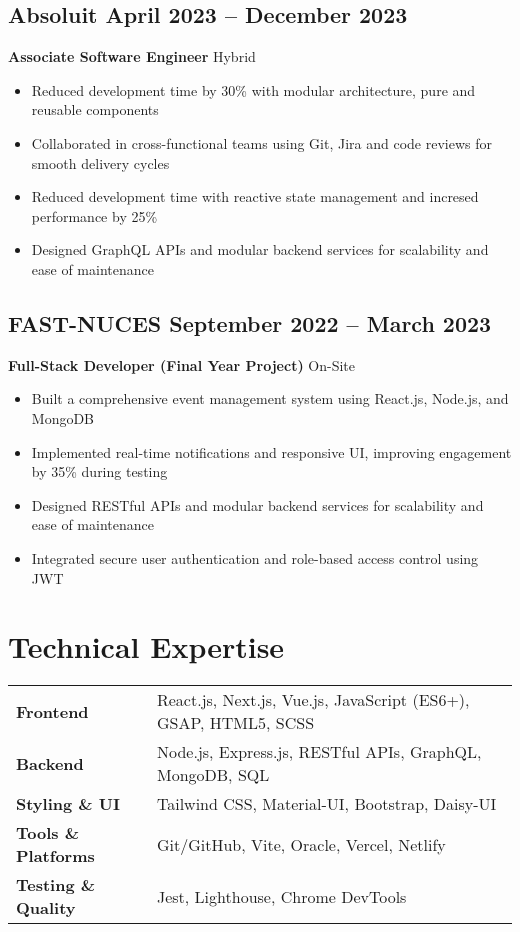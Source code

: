 \documentclass[11pt]{article}
\begin{document}
\subsection{\texorpdfstring{Absoluit \hfill April 2023 -- December 2023}{Absoluit, April 2023 -- December 2023}}
\textbf{Associate Software Engineer} \hfill Hybrid  
\begin{itemize}
\item Reduced development time by 30\% with modular architecture, pure and reusable components
\item Collaborated in cross-functional teams using Git, Jira and code reviews for smooth delivery cycles  
\item Reduced development time with reactive state management and incresed performance by 25\%
\item Designed GraphQL APIs and modular backend services for scalability and ease of maintenance  
\end{itemize}


\subsection{\texorpdfstring{FAST-NUCES \hfill September 2022 -- March 2023}{FAST-NUCES, September 2022 -- March 2023}}  
\textbf{Full-Stack Developer (Final Year Project)} \hfill On-Site  
\begin{itemize}
\item Built a comprehensive event management system using React.js, Node.js, and MongoDB  
\item Implemented real-time notifications and responsive UI, improving engagement by 35\% during testing  
\item Designed RESTful APIs and modular backend services for scalability and ease of maintenance  
\item Integrated secure user authentication and role-based access control using JWT  
\end{itemize}


\section{Technical Expertise}
\begin{tabularx}{\textwidth}{@{} l X @{}}
\textbf{Frontend} & React.js, Next.js, Vue.js, JavaScript (ES6+), GSAP, HTML5, SCSS \\
\textbf{Backend} & Node.js, Express.js, RESTful APIs, GraphQL, MongoDB, SQL \\
\textbf{Styling \& UI} & Tailwind CSS, Material-UI, Bootstrap, Daisy-UI \\
\textbf{Tools \& Platforms} & Git/GitHub, Vite, Oracle, Vercel, Netlify \\
\textbf{Testing \& Quality} & Jest, Lighthouse, Chrome DevTools \\
\end{tabularx}
\end{document}
